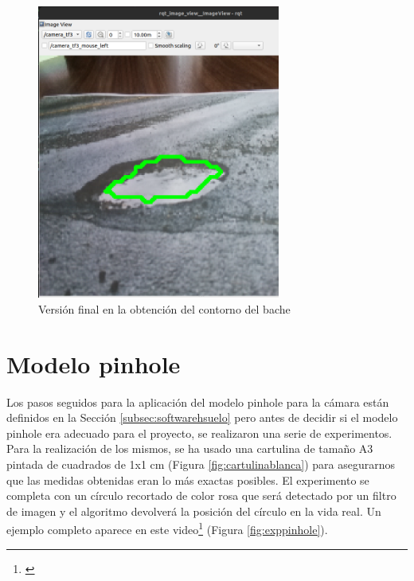  
 \begin{figure} [h!]
 	\begin{center}
 		\includegraphics[width=8cm]{figs/cap6/contornobache1.png}
 	\end{center}
 	\caption{Versión final en la obtención del contorno del bache}
 	\label{fig:contornobien}
 \end{figure}


\section{Modelo pinhole}
\label{sec:expmodelopinhole}

Los pasos seguidos para la aplicación del modelo pinhole para la cámara están definidos en la Sección \ref{subsec:softwarehsuelo} pero antes de decidir si el modelo pinhole era adecuado para el proyecto, se realizaron una serie de experimentos. Para la realización de los mismos, se ha usado una cartulina de tamaño A3 pintada de cuadrados de 1x1 cm (Figura \ref{fig:cartulinablanca}) para asegurarnos que las medidas obtenidas eran lo más exactas posibles. El experimento se completa con un círculo recortado de color rosa que será detectado por un filtro de imagen y el algoritmo devolverá la posición del círculo en la vida real. Un ejemplo completo aparece en este video\footnote{\url{}} (Figura \ref{fig:exppinhole}).

